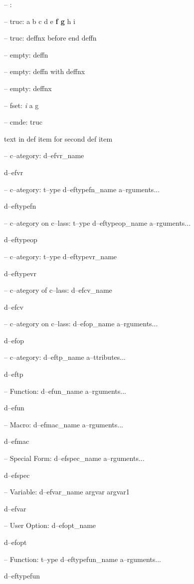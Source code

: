 \documentclass{book}
\begin{document}
\begin{titlepage}
\hbox{}-- : 


\hbox{}-- truc: a b c d e \textbf{f g} h i


\hbox{}-- truc: deffnx before end deffn



\hbox{}-- empty: deffn



\hbox{}-- empty: deffn with deffnx


\hbox{}-- empty: deffnx



\hbox{}-- fset: \emph{i} a g


\hbox{}-- cmde: truc 


text in def item for second def item

\hbox{}-- c--ategory: d--efvr\_name


d--efvr

\hbox{}-- c--ategory: t--ype d--eftypefn\_name a--rguments...


d--eftypefn

\hbox{}-- c--ategory on c--lass: t--ype d--eftypeop\_name a--rguments...


d--eftypeop

\hbox{}-- c--ategory: t--ype d--eftypevr\_name


d--eftypevr

\hbox{}-- c--ategory of c--lass: d--efcv\_name


d--efcv

\hbox{}-- c--ategory on c--lass: d--efop\_name a--rguments...


d--efop

\hbox{}-- c--ategory: d--eftp\_name a--ttributes...


d--eftp

\hbox{}-- Function: d--efun\_name a--rguments...


d--efun

\hbox{}-- Macro: d--efmac\_name a--rguments...


d--efmac

\hbox{}-- Special Form: d--efspec\_name a--rguments...


d--efspec

\hbox{}-- Variable: d--efvar\_name argvar argvar1


d--efvar

\hbox{}-- User Option: d--efopt\_name


d--efopt

\hbox{}-- Function: t--ype d--eftypefun\_name a--rguments...


d--eftypefun


\end{titlepage}
\end{document}
